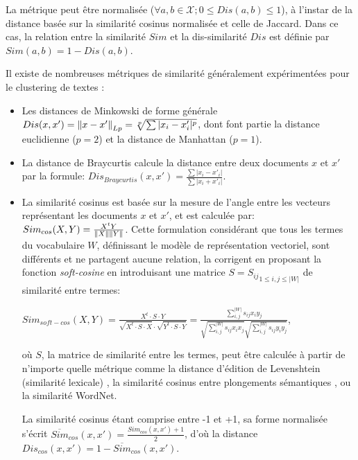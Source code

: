 La métrique peut être normalisée ($\forall a,b \in \mathcal{X};  0 \leq Dis(a,b) \leq 1$), à l'instar de la distance basée sur la similarité cosinus normalisée et celle de Jaccard. Dans ce cas, la relation entre la similarité $Sim$ et la dis-similarité $Dis$ est définie par $Sim(a,b) = 1 - Dis(a,b)$.

Il existe de nombreuses métriques de similarité généralement expérimentées pour le clustering de textes \citep{huang2008similarityTextClustering, vijaymeena2016surveySim, afzali2018SimKmeans}:
\begin{itemize}
	\item Les distances de Minkowski de forme générale $Dis(x,x') = \left\lVert x - x'\right\rVert_{Lp} = \sqrt[p]{\sum \vert x_i - x'_i \vert ^p}$, dont font partie la distance euclidienne ($p=2$) et la distance de Manhattan ($p=1$).
	\item La distance de Braycurtis calcule la distance entre deux documents $x$ et $x'$ par la formule: $Dis_{Braycurtis}(x,x') = \frac{\sum \vert x_i - x'_i \vert}{\sum \vert x_i + x'_i \vert}$.
	\item La similarité cosinus est basée sur la mesure de l'angle entre les vecteurs représentant les documents $x$ et $x'$, et est calculée par: $Sim_{cos}(X,Y) = \frac{X^tY}{\left\lVert X\right\rVert\left\lVert Y\right\rVert}$.
	Cette formulation considérant que tous les termes du vocabulaire $W$, définissant le modèle de représentation vectoriel, sont différents et ne partagent aucune relation, \citet{sidorov2014softcosine} la corrigent en proposant la fonction \textit{soft-cosine} en introduisant une matrice $S = {S_{ij}}_{1\leq i,j \leq \vert W \vert}$ de similarité entre  termes: 
	
	$Sim_{soft-cos}(X,Y)= \frac{X^t\cdot S\cdot Y}{\sqrt{X^t\cdot S\cdot X}\cdot \sqrt{Y^t\cdot S\cdot Y}} = \frac{\sum\limits_{i,j}^{\vert W \vert}s_{ij}x_iy_j}{\sqrt{\sum\limits_{i,j}^{\vert W \vert}s_{ij}x_ix_j}\sqrt{\sum\limits_{i,j}^{\vert W \vert}s_{ij}y_iy_j}}$,
	
	où $S$, la matrice de similarité entre les termes, peut être calculée à partir de n'importe quelle métrique comme la distance d'édition de Levenshtein (similarité lexicale) \citep{sidorov2014softcosine},  la similarité cosinus entre  plongements sémantiques \citep{charlet2017simbow_acl, charlet2017simbow_tal}, ou la similarité WordNet.
	
	La similarité cosinus  étant comprise entre -1 et +1, sa forme normalisée s'écrit  $\overline{Sim}_{cos}(x,x') = \frac{Sim_{cos}(x,x') + 1}{2}$, d'où la distance $Dis_{cos}(x,x') = 1 - \overline{Sim}_{cos}(x,x')$.
	

\end{itemize}
